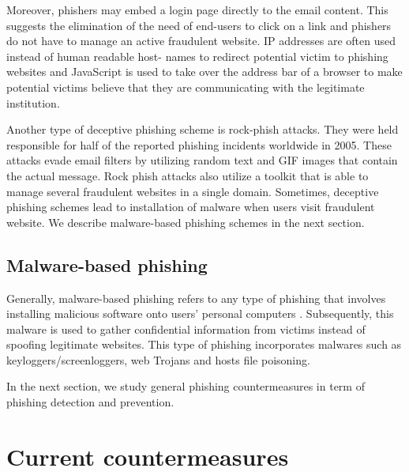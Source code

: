 Moreover, phishers may embed a login page directly to the email content.
This suggests the elimination of the need of end-users to click on
a link and phishers do not have to manage an active fraudulent website.
IP addresses are often used instead of human readable host- names
to redirect potential victim to phishing websites and JavaScript is
used to take over the address bar of a browser to make potential victims
believe that they are communicating with the legitimate institution.

Another type of deceptive phishing scheme is rock-phish attacks. They
were held responsible for half of the reported phishing incidents
worldwide in 2005\citep{moore:2007}. These attacks evade email filters
by utilizing random text and GIF images that contain the actual message.
Rock phish attacks also utilize a toolkit that is able to manage several
fraudulent websites in a single domain. Sometimes, deceptive phishing
schemes lead to installation of malware when users visit fraudulent
website. We describe malware-based phishing schemes in the next section. 


\subsection{Malware-based phishing}

Generally, malware-based phishing refers to any type of phishing that
involves installing malicious software onto users' personal computers
\citep{jakobsson:2006}. Subsequently, this malware is used to gather
confidential information from victims instead of spoofing legitimate
websites. This type of phishing incorporates malwares such as keyloggers/screenloggers,
web Trojans and hosts file poisoning.

In the next section, we study general phishing countermeasures in
term of phishing detection and prevention.


\section{Current countermeasures}

